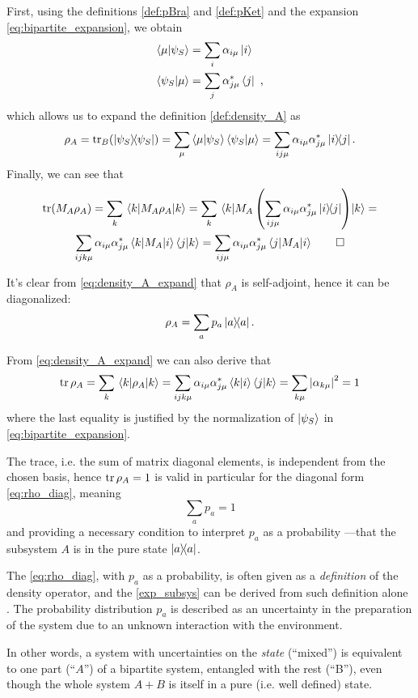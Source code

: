 First, using the definitions \ref{def:pBra} and \ref{def:pKet}
and the expansion \eqref{eq:bipartite_expansion}, we obtain
\begin{align*}
  \braket{\mu}{\psi_S} &= \sum_i \alpha_{i\mu}    \ket{i} \\
  \braket{\psi_S}{\mu} &= \sum_j \alpha_{j\mu}^{*}\bra{j} \ \text{,}
\end{align*}
which allows us to expand the definition \ref{def:density_A} as
\begin{equation}\label{eq:density_A_expand}
  \rho_A = \tr_B(\ketbra{\psi_S}{\psi_S}) =
    \sum_{\mu}\braket{\mu}{\psi_S}\braket{\psi_S}{\mu} =
    \sum_{ij\mu} \alpha_{i\mu}\alpha_{j\mu}^{*}\ketbra{i}{j} \text{.}
\end{equation}
Finally, we can see that
\begin{multline*}
  \tr(M_A \rho_A) = \sum_k \mel{k}{M_A \rho_A}{k} =
    \sum_k \mel {k} {M_A \left(\sum_{ij\mu} \alpha_{i\mu}\alpha_{j\mu}^{*}\ketbra{i}{j}\right)} {k} = \\
    \sum_{ijk\mu} \alpha_{i\mu}\alpha_{j\mu}^{*} \mel{k}{M_A}{i} \braket{j}{k} =
    \sum_{ij\mu} \alpha_{i\mu}\alpha_{j\mu}^{*} \mel{j}{M_A}{i}
  \qed
\end{multline*}

It's clear from \eqref{eq:density_A_expand} that $\rho_A$ is self-adjoint,
hence it can be diagonalized:
\begin{equation}\label{eq:rho_diag}
  \rho_A = \sum_a p_a \ketbra{a}{a} \text{.}
\end{equation}

From \eqref{eq:density_A_expand} we can also derive that
\begin{equation}
  \tr\rho_A = \sum_k \mel{k}{\rho_A}{k} =
    \sum_{ijk\mu}\alpha_{i\mu}\alpha_{j\mu}^{*}\braket{k}{i}\braket{j}{k} =
    \sum_{k\mu}\abs{\alpha_{k\mu}}^2 = 1
\end{equation}
where the last equality is justified by the normalization of $\ket{\psi_S}$
in \eqref{eq:bipartite_expansion}.

The trace, i.e. the sum of matrix diagonal elements, is independent
from the chosen basis, hence $\tr\rho_A = 1$ is valid in particular
for the diagonal form \eqref{eq:rho_diag}, meaning
\[
  \sum_a p_a = 1
\]
and providing a necessary condition to interpret $p_a$ as a probability
---that the subsystem $A$ is in the pure state $\ketbra{a}{a}$.

The \eqref{eq:rho_diag}, with $p_a$ as a probability, is often
given as a \emph{definition} of the density operator,
and the \eqref{exp_subsys} can be derived from
such definition alone \parencite{open_systems}.
The probability distribution ${p_a}$
is described as an uncertainty in the preparation of the system
due to an unknown interaction with the environment.

In other words, a system with uncertainties on the \emph{state}
(``mixed'') is equivalent to one part (``$A$'') of a bipartite system,
entangled with the rest (``B''), even though the whole system
$A+B$ is itself in a pure (i.e. well defined) state.
